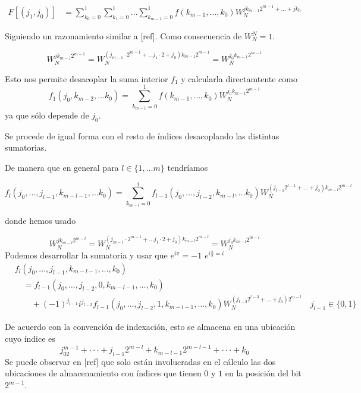 \begin{align}
    F[(j_1,j_0)] &= \sum_{k_0=0}^{1}  \sum_{k_1=0}^{1} \ldots \sum_{k_{m-1}=0}^{1} f(k_{m-1}, \ldots, k_0) W_N^{jk_{m-1}{2^{m-1}+ \ldots + jk_0}}
\end{align}

\noindent Siguiendo un razonamiento similar a [ref]. Como consecuencia de $W_N^N =1$.

\begin{equation}
    W_N^{jk_{m-1}{2^{m-1}}} =  W_N^{(j_{m-1}\cdot 2^{m-1}+ \ldots j_{1}\cdot 2 + j_0)k_{m-1}{2^{m-1}}}=W_N^{j_0k_{m-1}{2^{m-1}}}
\end{equation}

\noindent Esto nos permite  desacoplar la suma interior $f_1$ y calcularla directamtente  como 
\begin{equation}
    f_1 (j_0, k_{m-2}, \ldots k_0) = \sum_{k_{m-1}=0}^{1} f(k_{m-1}, \ldots, k_0) W_N^{j_0k_{m-1}{2^{m-1}}}
\end{equation}
ya que sólo depende de $j_0$.

\noindent Se procede de igual forma con el resto de índices desacoplando las distintas sumatorias.

\noindent De manera que en general para $l \in \{1, \ldots m\}$ tendríamos

\begin{equation}
    f_l (j_0, \ldots, j_{l-1},k_{m-l-1}, \ldots k_0) = \sum_{k_{m-l}=0}^{1} f_{l-1}(j_0, \ldots, j_{l-2},k_{m-l}, \ldots k_0)W_N^{(j_{l-1}2^{l-1}+\ldots+j_0)k_{m-l}2^{m-l}}
\end{equation}

\noindent donde hemos usado

\begin{equation}
    W_N^{jk_{m-l}{2^{m-l}}} =  W_N^{(j_{m-1}\cdot 2^{m-1}+ \ldots j_{1}\cdot 2 + j_0)k_{m-l}{2^{m-l}}}=W_N^{j_0k_{m-l}{2^{m-l}}}
\end{equation}
Podemos desarrollar la sumatoria y usar que $e^{i\pi}=-1$ $e^{i\frac{\pi}{2}=i}$
\begin{align*}
&f_l(j_0, \ldots, j_{l-1},k_{m-l-1}, \ldots, k_0) \\
&\quad = f_{l-1}(j_0, \ldots, j_{l-2},0,k_{m-l-1}, \ldots, k_0) \\
&\quad\quad + (-1)^{j_{l-1}}i^{j_{l-2}}f_{l-1}(j_0, \ldots, j_{l-2},1,k_{m-l-1}, \ldots, k_0)W_N^{(j_{l-3}2^{l-3}+\ldots+j_0)2^{m-l}} \quad j_{l-1} \in \{0,1\}  
\end{align*}

\noindent De acuerdo con la convención de indexación, esto se almacena en una ubicación cuyo índice es
\[ j_02^{m-1} + \cdot \cdot \cdot + j_{l-1}2^{m-l} + k_{m-l-1}2^{m-l-1} + \cdot \cdot \cdot + k_0 \]
Se puede observar en [ref] que solo están involucradas en el cálculo las dos ubicaciones de almacenamiento con índices que tienen $0$ y $1$ en la posición del bit \(2^{m-1}\). 

